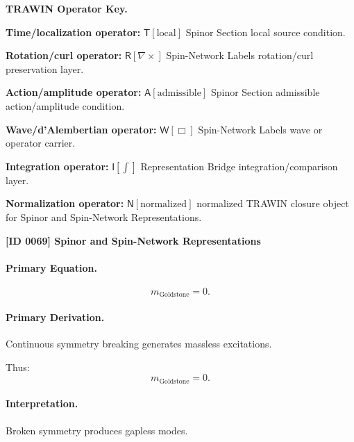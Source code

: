 \par\vspace{0.45\baselineskip}
\noindent\begin{minipage}[t]{\linewidth}
\begingroup
\small
\raggedright
\textbf{TRAWIN Operator Key.}\par
\noindent\textbf{Time/localization operator:} $\mathsf{T}\!\left[\mathrm{local}\right]$ Spinor Section local source condition.\par
\noindent\textbf{Rotation/curl operator:} $\mathsf{R}\!\left[\nabla\times\right]$ Spin-Network Labels rotation/curl preservation layer.\par
\noindent\textbf{Action/amplitude operator:} $\mathsf{A}\!\left[\mathrm{admissible}\right]$ Spinor Section admissible action/amplitude condition.\par
\noindent\textbf{Wave/d'Alembertian operator:} $\mathsf{W}\!\left[\Box\right]$ Spin-Network Labels wave or operator carrier.\par
\noindent\textbf{Integration operator:} $\mathsf{I}\!\left[\int\right]$ Representation Bridge integration/comparison layer.\par
\noindent\textbf{Normalization operator:} $\mathsf{N}\!\left[\mathrm{normalized}\right]$ normalized TRAWIN closure object for Spinor and Spin-Network Representations.\par
\endgroup
\end{minipage}

\clearpage
\noindent\textbf{[ID 0069] Spinor and Spin-Network Representations}\par
\vspace{0.35em}
\paragraph{Primary Equation.}
\begin{equation}
m_{\mathrm{Goldstone}} = 0.
\end{equation}

\paragraph{Primary Derivation.}
Continuous symmetry breaking generates massless excitations.

Thus:
\begin{equation}
\boxed{
m_{\mathrm{Goldstone}} = 0.
}
\end{equation}

\paragraph{Interpretation.}
Broken symmetry produces gapless modes.

